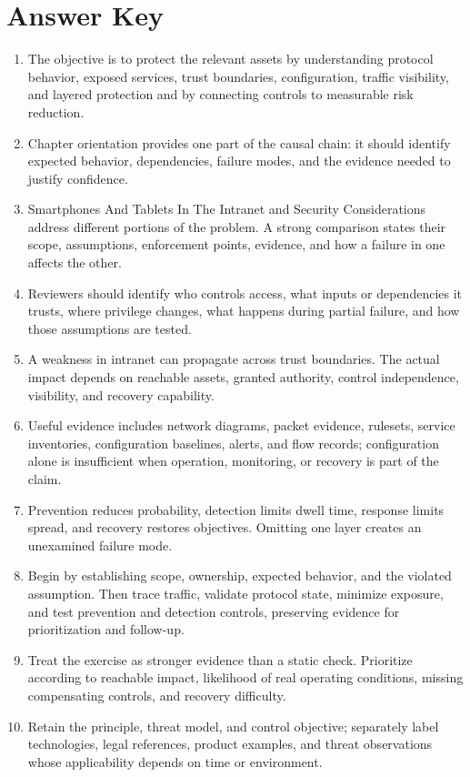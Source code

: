 \documentclass[11pt]{article}
\begin{document}
\section*{Answer Key}
\begin{enumerate}
\item The objective is to protect the relevant assets by understanding protocol behavior, exposed services, trust boundaries, configuration, traffic visibility, and layered protection and by connecting controls to measurable risk reduction.
\item Chapter orientation provides one part of the causal chain: it should identify expected behavior, dependencies, failure modes, and the evidence needed to justify confidence.
\item Smartphones And Tablets In The Intranet and Security Considerations address different portions of the problem. A strong comparison states their scope, assumptions, enforcement points, evidence, and how a failure in one affects the other.
\item Reviewers should identify who controls access, what inputs or dependencies it trusts, where privilege changes, what happens during partial failure, and how those assumptions are tested.
\item A weakness in intranet can propagate across trust boundaries. The actual impact depends on reachable assets, granted authority, control independence, visibility, and recovery capability.
\item Useful evidence includes network diagrams, packet evidence, rulesets, service inventories, configuration baselines, alerts, and flow records; configuration alone is insufficient when operation, monitoring, or recovery is part of the claim.
\item Prevention reduces probability, detection limits dwell time, response limits spread, and recovery restores objectives. Omitting one layer creates an unexamined failure mode.
\item Begin by establishing scope, ownership, expected behavior, and the violated assumption. Then trace traffic, validate protocol state, minimize exposure, and test prevention and detection controls, preserving evidence for prioritization and follow-up.
\item Treat the exercise as stronger evidence than a static check. Prioritize according to reachable impact, likelihood of real operating conditions, missing compensating controls, and recovery difficulty.
\item Retain the principle, threat model, and control objective; separately label technologies, legal references, product examples, and threat observations whose applicability depends on time or environment.
\end{enumerate}
\end{document}
